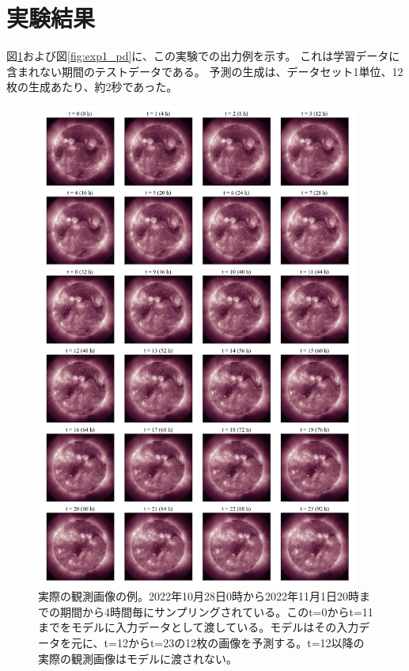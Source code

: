   \section{実験結果}
    図\ref{fig:exp1_gt}および図\ref{fig:exp1_pd}に、この実験での出力例を示す。
    これは学習データに含まれない期間のテストデータである。
    予測の生成は、データセット1単位、12枚の生成あたり、約2秒であった。
    \begin{figure}[htbp]
      \centering
      \includegraphics[width=0.95\textwidth]{figures/exp1/gt.png}
      \caption{実際の観測画像の例。2022年10月28日0時から2022年11月1日20時までの期間から4時間毎にサンプリングされている。このt=0からt=11までをモデルに入力データとして渡している。モデルはその入力データを元に、t=12からt=23の12枚の画像を予測する。t=12以降の実際の観測画像はモデルに渡されない。}
      \label{fig:exp1_gt}
    \end{figure}
